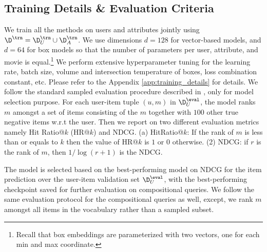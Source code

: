 \subsection{Training Details \& Evaluation Criteria}
\label{sec:traning_details}
We train all the methods on users and attributes jointly using $\D^\trn = \D_{U}^\trn \cup \D_{A}^\trn$.
We use dimensions $d=128$ for vector-based models, and $d=64$ for box models so that the number of parameters per user, attribute, and movie is equal.\footnote{Recall that box embeddings are parameterized with two vectors, one for each min and max coordinate.}
We perform extensive hyperparameter tuning for the {learning rate, batch size, volume and intersection temperature of boxes, loss combination constant, etc. Please refer to the Appendix \ref{app:training_details} for details.}
We follow the standard sampled evaluation procedure described in \citet{nc_vs_mf}, {only for model selection purpose}. For each user-item tuple $(u, m)$ in $\D_U^\eval$, the model ranks $m$ amongst a set of items consisting of the  $m$ together with $100$  other true negative items w.r.t the user. Then we report on two different evaluation metrics namely Hit Ratio@$k$ (HR@$k$) and NDCG. (a) HitRatio@$k$: If the rank of $m$  is less than or equals to $k$ then the value of HR@$k$ is $1$ or $0$ otherwise. (2) NDCG: if $r$ is the rank of $m$, then  $1/\log(r + 1)$ is the NDCG.

The model is selected based on the best-performing model on NDCG for the item prediction over the user-item validation 
set $\D_U^\eval$,  with the best-performing checkpoint saved for further evaluation on compositional queries. We follow the same evaluation protocol for the compositional queries as well, except, {we rank $m$ amongst all items in the vocabulary rather than a sampled subset.}
\vspace{-5pt}
